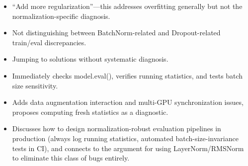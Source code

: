 \begin{interviewq}
\redflags
\begin{itemize}
    \item ``Add more regularization''---this addresses overfitting generally but not the normalization-specific diagnosis.
    \item Not distinguishing between BatchNorm-related and Dropout-related train/eval discrepancies.
    \item Jumping to solutions without systematic diagnosis.
\end{itemize}


\goodgreat
\begin{itemize}
    \item {} Immediately checks model.eval(), verifies running statistics, and tests batch size sensitivity.
    \item {} Adds data augmentation interaction and multi-GPU synchronization issues, proposes computing fresh statistics as a diagnostic.
    \item {} Discusses how to design normalization-robust evaluation pipelines in production (always log running statistics, automated batch-size-invariance tests in CI), and connects to the argument for using LayerNorm/RMSNorm to eliminate this class of bugs entirely.
\end{itemize}

\end{interviewq}
